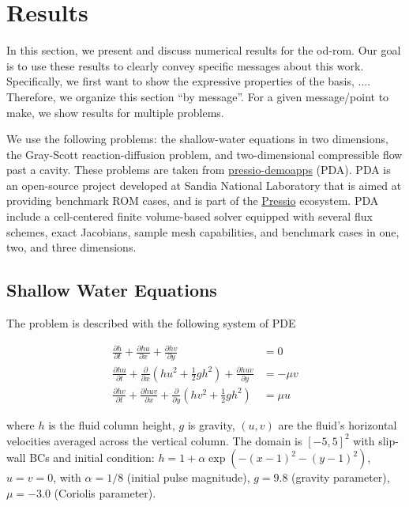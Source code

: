 

\section{Results} \label{sec:results}

In this section, we present and discuss numerical results for the od-rom.
Our goal is to use these results to clearly convey specific messages about this work.
Specifically, we first want to show the expressive properties of the basis, ....
Therefore, we organize this section ``by message''.
For a given message/point to make, we show results for multiple problems.

We use the following problems: the shallow-water equations in two dimensions, the Gray-Scott reaction-diffusion problem, and two-dimensional compressible flow past a cavity.
These problems are taken from \href{https://pressio.github.io/pressio-demoapps}{\textsf{pressio-demoapps}} (PDA).
PDA is an open-source project developed at Sandia National Laboratory that is aimed at providing benchmark ROM cases, and is part of the \href{https://pressio.github.io/}{\textsf{Pressio}} ecosystem.
PDA include a cell-centered finite volume-based solver equipped with several flux schemes, exact Jacobians, sample mesh capabilities, and benchmark cases in one, two, and three dimensions.

\subsection{Shallow Water Equations}

The problem is described with the following system of PDE

\begin{align}
  \frac{\partial h}{\partial t} + \frac{\partial hu}{\partial x} + \frac{\partial hv}{\partial y} &= 0 \\
  \frac{\partial hu}{\partial t} + \frac{\partial }{\partial x} (hu^2 + \frac{1}{2}g h^2) + \frac{\partial huv}{\partial y} &= -\mu v \\
  \frac{\partial hv}{\partial t} + \frac{\partial huv}{\partial x} + \frac{\partial }{\partial y} (hv^2 + \frac{1}{2}g h^2) &= \mu u
\end{align}

where $h$ is the fluid column height, $g$ is gravity, $(u, v)$ are the fluid's horizontal velocities averaged across the vertical column.
The domain is $[-5, 5]^2$ with slip-wall BCs and initial condition: $h = 1 + \alpha \exp( -(x-1)^2 - (y-1)^2)$, $u = v = 0$,
with $\alpha = 1/8$ (initial pulse magnitude), $g = 9.8$ (gravity parameter), $\mu = -3.0$ (Coriolis parameter).



